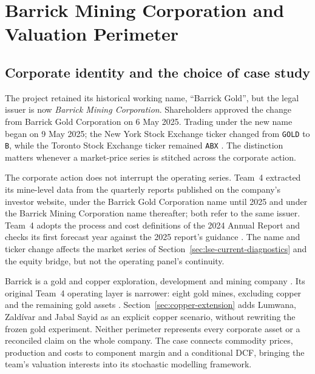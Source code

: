 \chapter{Barrick Mining Corporation and Valuation Perimeter}

\section{Corporate identity and the choice of case study}
\label{sec:company-identity}

The project retained its historical working name, ``Barrick Gold'', but the
legal issuer is now \emph{Barrick Mining Corporation}. Shareholders approved
the change from Barrick Gold Corporation on 6 May 2025. Trading under the new
name began on 9 May 2025; the New York Stock Exchange ticker changed from
\texttt{GOLD} to \texttt{B}, while the Toronto Stock Exchange ticker remained
\texttt{ABX} \cite{barrick-name-2025}. The distinction matters whenever a
market-price series is stitched across the corporate action.

The corporate action does not interrupt the operating series. Team~4 extracted
its mine-level data from the quarterly reports published on the company's
investor website, under the Barrick Gold Corporation name until 2025 and under
the Barrick Mining Corporation name thereafter; both refer to the same issuer.
Team~4 adopts the process and cost definitions of the 2024 Annual Report and
checks its first forecast year against the 2025 report's guidance
\cite{team4,barrick-ar-2025}. The name and ticker change affects the market
series of Section~\ref{sec:lse-current-diagnostics} and the equity bridge,
but not the operating panel's continuity.

Barrick is a gold and copper exploration, development and mining company
\cite{barrick-about-2026}. Its original Team~4 operating layer is narrower:
eight gold mines, excluding copper and the remaining gold assets \cite{team4}.
Section~\ref{sec:copper-extension} adds Lumwana, Zald\'ivar and Jabal Sayid as
an explicit copper scenario, without rewriting the frozen gold experiment.
Neither perimeter represents every corporate asset or a reconciled claim on
the whole company. The case connects commodity prices, production and costs
to component margin and a conditional DCF, bringing the team's valuation
interests into its stochastic modelling framework.

